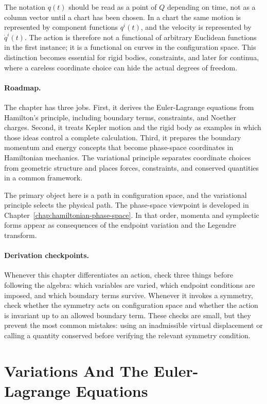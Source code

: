 The notation \(q(t)\) should be read as a point of \(Q\) depending on time, not
as a column vector until a chart has been chosen.  In a chart the same motion is
represented by component functions \(q^i(t)\), and the velocity is represented
by \(\dot q^i(t)\).  The action is therefore not a functional of arbitrary
Euclidean functions in the first instance; it is a functional on curves in the
configuration space.  This distinction becomes essential for rigid bodies,
constraints, and later for continua, where a careless coordinate choice can
hide the actual degrees of freedom.

\paragraph{Roadmap.}
The chapter has three jobs. First, it derives the Euler-Lagrange equations from
Hamilton's principle, including boundary terms, constraints, and Noether
charges. Second, it treats Kepler motion and the rigid body as examples in
which those ideas control a complete calculation. Third, it prepares the
boundary momentum and energy concepts that become phase-space coordinates in
Hamiltonian mechanics. The
variational principle separates coordinate choices from geometric structure and
places forces, constraints, and conserved quantities in a common framework.

The primary object here is a path in configuration space, and the variational
principle selects the physical path. The phase-space viewpoint is developed in
Chapter~\ref{chap:hamiltonian-phase-space}. In that order, momenta and
symplectic forms appear as consequences of the endpoint variation and the
Legendre transform.

\paragraph{Derivation checkpoints.}
Whenever this chapter differentiates an action, check three things before
following the algebra: which variables are varied, which endpoint conditions
are imposed, and which boundary terms survive. Whenever it invokes a symmetry,
check whether the symmetry acts on configuration space and whether the action
is invariant up to an allowed boundary term. These checks are small, but they
prevent the most common mistakes: using an inadmissible virtual displacement or
calling a quantity conserved before verifying the relevant symmetry condition.

\section{Variations And The Euler-Lagrange Equations}
\label{sec:euler-lagrange}

